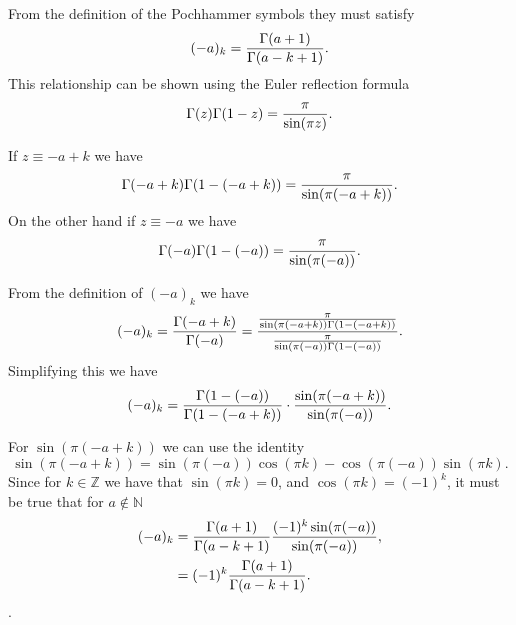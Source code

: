 From the definition of the Pochhammer symbols they must satisfy
\begin{equation}
  (-a)_k = {\Gamma (a + 1) \over \Gamma (a - k + 1)}.
\end{equation}
This relationship can be shown using the Euler reflection formula
\begin{equation}
  \Gamma (z) \Gamma (1 - z) = {\pi \over \sin (\pi z)}.
\end{equation}

If $z \equiv -a + k$ we have
\begin{equation}
  \Gamma(-a + k) \Gamma(1 - (-a + k)) = {\pi \over \sin(\pi (-a + k))}.
\end{equation}
On the other hand if $z \equiv -a$ we have
\begin{equation}
  \Gamma(-a) \Gamma(1 - (-a)) = {\pi \over \sin(\pi (-a))}.
\end{equation}

From the definition of $(-a)_k$ we have
\begin{equation}
  (-a)_k = {\Gamma(-a + k) \over \Gamma(-a)}
         = {{\pi \over \sin(\pi (-a + k)) \Gamma(1 - (-a + k))}
         \over
           {\pi \over \sin(\pi(-a)) \Gamma(1 - (-a))}}.
\end{equation}
Simplifying this we have
\begin{equation}
  (-a)_k = {\Gamma(1 - (-a)) \over \Gamma(1 - (-a + k))}\cdot
           {\sin(\pi (-a + k)) \over \sin(\pi (-a))}.
\end{equation}

For $\sin(\pi (-a + k))$ we can use the identity
\begin{equation}
  \sin(\pi (-a + k)) = \sin(\pi (-a)) \cos(\pi k) -
                       \cos(\pi (-a)) \sin(\pi k).
\end{equation}
Since for $k \in \mathbb{Z}$ we have that $\sin(\pi k) = 0$, and
$\cos(\pi k) = (-1)^k$, it must be true that for $a \notin \mathbb{N}$
\begin{align}
  (-a)_k &= {\Gamma(a + 1) \over \Gamma(a - k + 1)}
           {(-1)^k \sin(\pi (-a)) \over \sin(\pi (-a))},\\
         &= (-1)^k {\Gamma(a + 1) \over \Gamma(a - k + 1)}.
\end{align}
.

